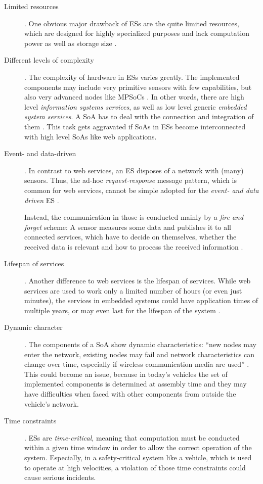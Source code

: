 \begin{description}
\item [Limited resources].
One obvious major drawback of ESs are the quite limited resources, which are designed for highly specialized purposes and lack computation power as well as storage size \cite{rodrigues2011} \cite{scholz} \cite{sommer}.

\item [Different levels of complexity].
The complexity of hardware in ESs varies greatly. The implemented components may include very primitive sensors with few capabilities, but also very advanced nodes like MPSoCs \cite{scholz} \cite{sommer}. In other words, there are high level \emph{information systems services}, as well as low level generic \emph{embedded system services}. A SoA has to deal with the connection and integration of them \cite{rodrigues2011}. This task gets aggravated if SoAs in ESs become interconnected with high level SoAs like web applications.

\item [Event- and data-driven].
In contrast to web services, an ES disposes of a network with (many) sensors. Thus, the ad-hoc \emph{request-response} message pattern, which is common for web services, cannot be simple adopted for the \emph{event- and data driven} ES \cite{sommer}.

Instead, the communication in those is conducted mainly by a \emph{fire and forget} scheme: A sensor measures some data and publishes it to all connected services, which have to decide on themselves, whether the received data is relevant and how to process the received information \cite{sommer}.

\item [Lifespan of services].
Another difference to web services is the lifespan of services. While web services are used to work only a limited number of hours (or even just minutes), the services in embedded systems could have application times of multiple years, or may even last for the lifespan of the system \cite{buckl}.

\item [Dynamic character]. 
The components of a SoA show dynamic characteristics: ``new nodes may enter the network, existing nodes may fail and network characteristics can change over time, especially if wireless communication media are used'' \cite{sommer}. This could become an issue, because in today's vehicles the set of implemented components is determined at assembly time and they may have difficulties when faced with other components from outside the vehicle's network.

\item [Time constraints].
ESs are \emph{time-critical}, meaning that computation must be conducted within a given time window in order to allow the correct operation of the system. Especially, in a safety-critical system like a vehicle, which is used to operate at high velocities, a violation of those time constraints could cause serious incidents.
\end{description}


